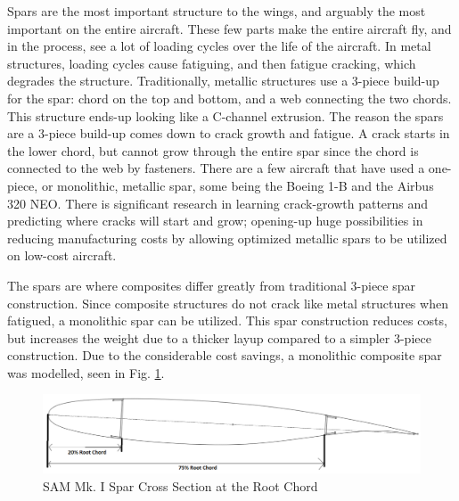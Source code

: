 Spars are the most important structure to the wings, and arguably the most important on the entire aircraft. These few parts make the entire aircraft fly, and in the process, see a lot of loading cycles over the life of the aircraft. In metal structures, loading cycles cause fatiguing, and then fatigue cracking, which degrades the structure. Traditionally, metallic structures use a 3-piece build-up for the spar: chord on the top and bottom, and a web connecting the two chords. This structure ends-up looking like a C-channel extrusion. The reason the spars are a 3-piece build-up comes down to crack growth and fatigue. A crack starts in the lower chord, but cannot grow through the entire spar since the chord is connected to the web by fasteners. There are a few aircraft that have used a one-piece, or monolithic, metallic spar, some being the Boeing 1-B and the Airbus 320 NEO. There is significant research in learning crack-growth patterns and predicting where cracks will start and grow; opening-up huge possibilities in reducing manufacturing costs by allowing optimized metallic spars to be utilized on low-cost aircraft.

\newpage
The spars are where composites differ greatly from traditional 3-piece spar construction. Since composite structures do not crack like metal structures when fatigued, a monolithic spar can be utilized. This spar construction reduces costs, but increases the weight due to a thicker layup compared to a simpler 3-piece construction. Due to the considerable cost savings, a monolithic composite spar was modelled, seen in Fig. \ref{fig:spar_layout}.

\begin{figure}[!h]
    \centering
    \includegraphics[width=\linewidth]{Photos/structuresandloads/Spar Layout.PNG}
    \caption{SAM Mk. I Spar Cross Section at the Root Chord}
    \label{fig:spar_layout}
\end{figure}

